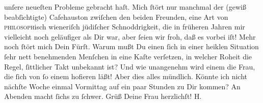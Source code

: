 \begin{ledgroupsized}[t]{13cm}
               unſere neueſten Probleme gebracht haſt. Mich ſtört nur manchmal der (gewiß
               beabſichtigte) Cafehauston zwiſchen den beiden Freunden, eine Art von \textsc{philosoph}isch wieneriſch
               jüdiſcher Schnoddrigkeit, die in früheren Jahren mir vielleicht noch geläufiger als
               Dir war, aber ſeien wir froh, daß es vorbei iſt! Mehr noch ſtört mich Dein Fürſt. Warum mußt Du einen ſich
               in einer heiklen Situation ſehr nett benehmenden Menſchen in eine Kaſte verſetzen, in
               welcher Roheit die Regel, ſittlicher Takt unbekannt ist? Und wie unangenehm wird
               einem die Frau, die ſich von ſo einem hofieren läßt! Aber dies alles mündlich. Könnte
               ich nicht nächſte Woche einmal Vormittag auf ein paar Stunden zu Dir kommen? An
               Abenden macht ſichs zu ſchwer. Grüß Deine Frau herzlichſt! \spacefill\mbox{H.}\pend
           
         
         \endnumbering{}\end{ledgroupsized}  \newcommand{\dateiname}{L01550}\newcommand{\titel}{Hermann Bahr an Arthur Schnitzler, 20. 9. 1905}\newcommand{\editorInnen}{ Kurt Ifkovits,  Martin Anton Müller}
      